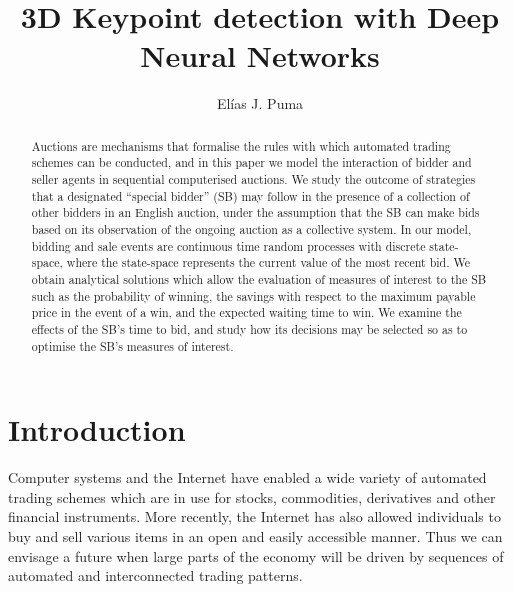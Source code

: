 \documentclass{comjnl}
\begin{document}
\title[Modelling Bidders in Sequential Automated Auctions]{3D Keypoint detection with Deep Neural Networks}
\author{El\'{i}as J. Puma}
 






\begin{abstract}
Auctions are mechanisms that formalise the rules with which
automated trading schemes can be conducted, and in this paper we
model the interaction of bidder and seller agents in sequential
computerised auctions. We study the outcome of strategies that a
designated ``special bidder'' (SB) may follow in the presence of a
collection of other bidders in an English auction, under the
assumption that the SB can make bids based on its observation of
the ongoing auction as a collective system. In our model, bidding
and sale events are continuous time random processes with discrete
state-space, where the state-space represents the current value of
the most recent bid. We obtain analytical solutions which allow
the evaluation of measures of interest to the SB such as the
probability of winning, the savings with respect to the maximum
payable price in the event of a win, and the expected waiting time
to win. We examine the effects of the SB's time to bid, and study
how its decisions may be selected so as to optimise the SB's
measures of interest.
\end{abstract}

\maketitle


\section{Introduction}

Computer systems and the Internet have enabled a wide variety of
automated trading schemes which are in use for stocks,
commodities, derivatives and other financial instruments. More
recently, the Internet has also allowed individuals to buy and
sell various items in an open and easily accessible manner. Thus
we can envisage a future when large parts of the economy will be
driven by sequences of automated and interconnected trading
patterns.
\end{document}
